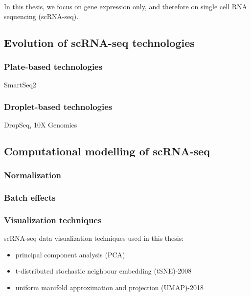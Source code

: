 In this thesis, we focus on gene expression only, and therefore on single cell RNA sequencing (scRNA-seq).

\subsection{Evolution of scRNA-seq technologies}

\subsubsection{Plate-based technologies}

SmartSeq2

\subsubsection{Droplet-based technologies}

DropSeq, 10X Genomics


\subsection{Computational modelling of scRNA-seq}
\subsubsection{Normalization}

\subsubsection{Batch effects}

\subsubsection{Visualization techniques}

scRNA-seq data visualization techniques used in this thesis: 

\begin{itemize}
    \item principal component analysis (PCA)
    \item t-distributed stochastic neighbour embedding (tSNE)-2008 \cite{maaten2008visualizing}
    \item uniform manifold approximation and projection (UMAP)-2018 \cite{mcinnes2018umap}
\end{itemize}


